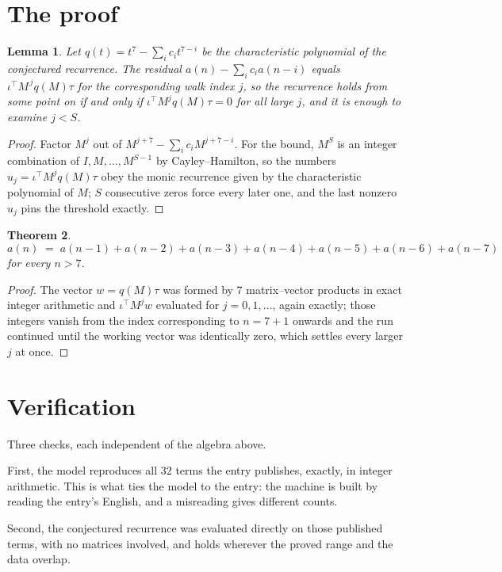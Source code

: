 \documentclass[11pt,a4paper]{article}
\theoremstyle{plain}
\newtheorem{theorem}{Theorem}
\newtheorem{lemma}[theorem]{Lemma}
\theoremstyle{definition}
\begin{document}
\section{The proof}

\begin{lemma}\label{lem:crit}
Let $q(t)=t^{7}-\sum_i c_it^{7-i}$ be the characteristic polynomial of the
conjectured recurrence. The residual $a(n)-\sum_ic_ia(n-i)$ equals
$\iota^{\!\top}M^{\,j}q(M)\tau$ for the corresponding walk index $j$, so the recurrence
holds from some point on if and only if $\iota^{\!\top}M^{j}q(M)\tau=0$ for all large $j$,
and it is enough to examine $j<S$.
\end{lemma}

\begin{proof}
Factor $M^{j}$ out of $M^{j+7}-\sum_ic_iM^{j+7-i}$. For the bound, $M^{S}$
is an integer combination of $I,M,\dots,M^{S-1}$ by Cayley--Hamilton, so the numbers
$u_j=\iota^{\!\top}M^{j}q(M)\tau$ obey the monic recurrence given by the characteristic
polynomial of $M$; $S$ consecutive zeros force every later one, and the last nonzero $u_j$
pins the threshold exactly.
\end{proof}

\begin{theorem}
\[
a(n)\;=\;a(n-1) + a(n-2) + a(n-3) + a(n-4) + a(n-5) + a(n-6) + a(n-7)
\]
for every $n>7$.
\end{theorem}

\begin{proof}
The vector $w=q(M)\tau$ was formed by $7$ matrix--vector products in exact integer
arithmetic and $\iota^{\!\top}M^{j}w$ evaluated for $j=0,1,\dots$, again exactly; those
integers vanish from the index corresponding to $n=7+1$ onwards and the run continued
until the working vector was identically zero, which settles every larger $j$ at once.
\end{proof}

\section{Verification}

Three checks, each independent of the algebra above.

First, the model reproduces all $32$ terms the entry publishes, exactly, in integer
arithmetic. This is what ties the model to the entry: the machine is built by reading the
entry's English, and a misreading gives different counts.

Second, the conjectured recurrence was evaluated directly on those published terms, with no
matrices involved, and holds wherever the proved range and the data overlap.
\end{document}
